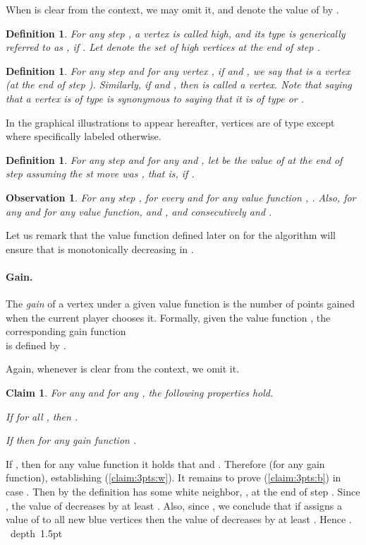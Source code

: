 \documentclass[11pt]{article}
\def\Proof{\par\noindent{\bf Proof:~}}
\def\blackslug{\hbox{\hskip 1pt \vrule width 4pt height 8pt
    depth 1.5pt \hskip 1pt}}
\def\QED{\quad\blackslug\lower 8.5pt\null\par}
\def\dnsitem{\vspace{-7pt}\item}
\newtheorem{definition}[theorem]{Definition}
\newtheorem{claim}[theorem]{Claim}
\newtheorem{observation}[theorem]{Observation}
\theoremstyle{definition}
\begin{document}
When  is clear from the context, we may omit it, and denote the value of  by .

\begin{definition}
For any step , a vertex  is called \emph{high}, 
and its type is generically referred to as , if .
Let  denote the set of high vertices at the end of step .
\end{definition}

\begin{definition}
For any step  and for any vertex , if  and , we say that  is a  vertex (at the end of step ).
Similarly, if  and , then  is called a  vertex.
Note that saying that a vertex is of type  is synonymous to saying that it is of type  or .
\end{definition}

In the graphical illustrations to appear hereafter, vertices are of type  except where specifically labeled otherwise.

\begin{definition}
For any step  and for any  and ,
let  be the value of  at the end of step  assuming the st move was ,
that is,  if .

\end{definition}

\begin{observation}
For any step , for every  and for any value function , .
Also, for any  and for any value function,  and , and consecutively  and .
\end{observation}

Let us remark that the value function defined later on for the algorithm will ensure that  is monotonically decreasing in .

\paragraph{Gain.}
The \emph{gain} of a vertex  under a given value function is the number of points gained when the current player chooses it. Formally, 
given the value function , the corresponding gain function \\
 is defined by
.

Again, whenever  is clear from the context, we omit it.

\begin{claim}
\label{claim:3pts}
For any  and for any , the following properties hold.
\begin{enumerate}[(a)]
{\setlength\itemindent{10pt} 
	\dnsitem 
	\label{claim:3pts:b}
	If  for all , then .
	
	\dnsitem 
	\label{claim:3pts:w}
	If  then  for any gain function .
}
\end{enumerate}
\end{claim}
\Proof
If , then for any value function it holds that  and . 
Therefore  (for any gain function), establishing (\ref{claim:3pts:w}).
It remains to prove (\ref{claim:3pts:b}) in case . Then by the definition  has some white neighbor, , at the end of step . 
Since , the value of  decreases by at least . 
Also, since , we conclude that if  assigns a value of  to all new blue vertices then the value of  decreases by at least . 
Hence .
\QED
\end{document}
